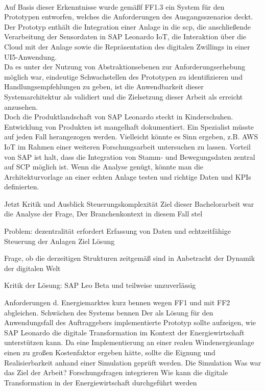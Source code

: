 \\ Auf Basis dieser Erkenntnisse wurde gemäßf FF1.3 ein System für den Prototypen entworfen, welches die Anforderungen des Ausgangsszenarios deckt. Der Prototyp enthält die Integration einer Anlage in die \ac{scp}, die anschließende Verarbeitung der Sensordaten in SAP Leonardo IoT, die Interaktion über die Cloud mit der Anlage sowie die Repräsentation des digitalen Zwillings in einer UI5-Anwendung. 
\\%
Da es unter der Nutzung von Abstraktionsebenen zur Anforderungserhebung möglich war, eindeutige Schwachstellen des Prototypen zu identifizieren und Handlungsempfehlungen zu geben, ist die Anwendbarkeit dieser Systemarchitektur als validiert und die Zielsetzung dieser Arbeit als erreicht anzusehen.
\\Doch die Produktlandschaft von SAP Leonardo steckt in Kinderschuhen. Entwicklung von Produkten ist mangelhaft dokumentiert. Ein Spezialist müsste auf jeden Fall herangezogen werden. Vielleicht könnte es Sinn ergeben, z.B. AWS IoT im Rahmen einer weiteren Forschungsarbeit untersuchen zu lassen. Vorteil von SAP ist halt, dass die Integration von Stamm- und Bewegungsdaten zentral auf SCP möglich ist. Wenn die Analyse genügt, könnte man die Architekturvorlage an einer echten Anlage testen und richtige Daten und KPIs definierten. 






Jetzt Kritik 
und Ausblick
Steuerungskomplexität 
Ziel dieser Bachelorarbeit war die Analyse der Frage,  Der Branchenkontext in diesem Fall stel

Problem: dezentralität erfordert Erfassung von Daten und echtzeitfähige Steuerung der Anlagen 
Ziel
Lösung

Frage, ob die derzeitigen Strukturen zeitgemäß sind in Anbetracht der Dynamik der digitalen Welt

Kritik der Lösung: SAP Leo Beta und teilweise unzuverlässig

Anforderungen d. Energiemarktes kurz bennen wegen FF1 und mit FF2 abgleichen. Schwächen des Systems bennen 
Der als Lösung für den Anwendungsfall des Auftraggebers implementierte Prototyp sollte aufzeigen, wie SAP Leonardo die digitale Transformation im Kontext der Energiewirtschaft unterstützen kann. Da eine Implementierung an einer realen Windenergieanlage einen zu großen Kostenfaktor ergeben hätte, sollte die Eignung und Realisierbarkeit anhand einer Simulation geprüft werden. Die Simulation 
Was war das Ziel der Arbeit? Forschungsfragen integrieren
Wie kann die digitale Transformation in der Energiewirtschaft durchgeführt werden


